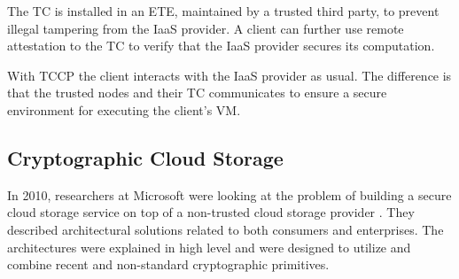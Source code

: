 \documentclass[pdftex,english,10pt,b5paper,twoside]{book}
\begin{document}
The TC is installed in an \ac{ETE}, maintained by a trusted third party, to prevent illegal tampering
from the IaaS provider. A client can further use remote attestation to the TC to
verify that the IaaS provider secures its computation.

With TCCP the client interacts with the IaaS provider as usual. The difference
is that the trusted nodes and their TC communicates to ensure a secure environment for executing
the client's VM.

\subsection{Cryptographic Cloud Storage}
In 2010, researchers at Microsoft were looking at the problem of building a secure
cloud storage service on top of a non-trusted cloud storage provider
\cite{microsoftresearch}. They described architectural solutions related to both consumers and
enterprises. The architectures were explained in high level and were designed to
utilize and combine recent and non-standard cryptographic primitives.
\end{document}
